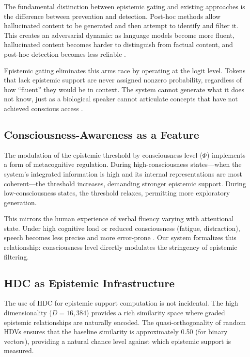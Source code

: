\documentclass[12pt,a4paper]{article}
\begin{document}
The fundamental distinction between epistemic gating and existing approaches is the difference between prevention and detection. Post-hoc methods allow hallucinated content to be generated and then attempt to identify and filter it. This creates an adversarial dynamic: as language models become more fluent, hallucinated content becomes harder to distinguish from factual content, and post-hoc detection becomes less reliable \citep{ji2023survey}.

Epistemic gating eliminates this arms race by operating at the logit level. Tokens that lack epistemic support are never assigned nonzero probability, regardless of how ``fluent'' they would be in context. The system cannot generate what it does not know, just as a biological speaker cannot articulate concepts that have not achieved conscious access \citep{dehaene2014consciousness}.

\subsection{Consciousness-Awareness as a Feature}

The modulation of the epistemic threshold by consciousness level ($\Phi$) implements a form of metacognitive regulation. During high-consciousness states---when the system's integrated information is high and its internal representations are most coherent---the threshold increases, demanding stronger epistemic support. During low-consciousness states, the threshold relaxes, permitting more exploratory generation.

This mirrors the human experience of verbal fluency varying with attentional state. Under high cognitive load or reduced consciousness (fatigue, distraction), speech becomes less precise and more error-prone \citep{levelt1989speaking}. Our system formalizes this relationship: consciousness level directly modulates the stringency of epistemic filtering.

\subsection{HDC as Epistemic Infrastructure}

The use of HDC for epistemic support computation is not incidental. The high dimensionality ($D = 16{,}384$) provides a rich similarity space where graded epistemic relationships are naturally encoded. The quasi-orthogonality of random HDVs ensures that the baseline similarity is approximately 0.50 (for binary vectors), providing a natural chance level against which epistemic support is measured.
\end{document}
